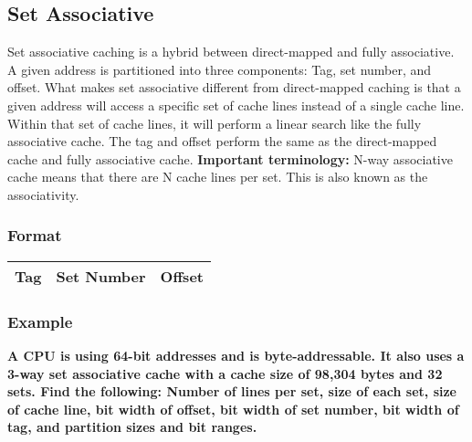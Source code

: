 \documentclass[11pt]{article}
\begin{document}
\subsection{Set Associative}

Set associative caching is a hybrid between direct-mapped and fully associative. A given address is partitioned into three components: Tag, set number, and offset. What makes set associative different from direct-mapped caching is that a given address will access a specific set of cache lines instead of a single cache line. Within that set of cache lines, it will perform a linear search like the fully associative cache. The tag and offset perform the same as the direct-mapped cache and fully associative cache. \textbf{Important terminology:} N-way associative cache means that there are N cache lines per set. This is also known as the associativity.

\subsubsection{Format}

\begin{table}[H]
	\centering
	\begin{tabular}{| c | c | c|}
		\hline
		Tag			&		Set Number	&	 Offset\\
		\hline
	\end{tabular}
\end{table}

\subsubsection{Example}

\textbf{A CPU is using 64-bit addresses and is byte-addressable. It also uses a 3-way set associative cache with a cache size of 98,304 bytes and 32 sets. Find the following: Number of lines per set, size of each set, size of cache line, bit width of offset, bit width of set number, bit width of tag, and partition sizes and bit ranges.}
\end{document}
